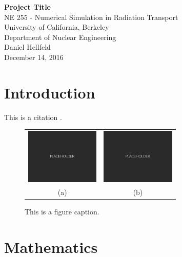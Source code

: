 \documentclass[10pt]{article}
\begin{document}
\begin{centering}
\textbf{Project Title}\\
\vspace{11pt}
NE 255 - Numerical Simulation in Radiation Transport\\
University of California, Berkeley\\
Department of Nuclear Engineering\\
\vspace{11pt}
Daniel Hellfeld\\
\vspace{11pt}
December 14, 2016 \\
\end{centering}


\section{Introduction}

\lipsum[1]

\vspace{10pt}
This is a citation \cite{Agostinelli2003}.


\begin{figure}[htb]
\hypertarget{fig1}{}
\centering
\begin{tabular}{cc}
	\includegraphics[width=100pt]{Figures/Placeholder.png} & 
	\includegraphics[width=100pt]{Figures/Placeholder.png} \\
	\scriptsize{(a)} & \scriptsize{(b)}
\end{tabular}
\caption{This is a figure caption.}
\end{figure}





\section{Mathematics}
\end{document}
